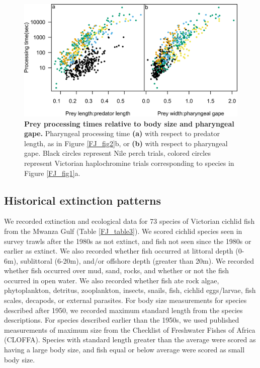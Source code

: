 \begin{figure}
    \centering
    \includegraphics[width=\textwidth]{FishJaws/figures/fig5}
    \caption{\textbf{Prey processing times relative to body size and pharyngeal gape.} Pharyngeal processing time \textbf{(a)} with respect to predator length, as in Figure \ref{FJ_fig2}b, or \textbf{(b)} with respect to pharyngeal gape. Black circles represent Nile perch trials, colored circles represent Victorian haplochromine trials corresponding to species in Figure \ref{FJ_fig1}a.}
    \label{FJ_fig5}
\end{figure}

\subsection{Historical extinction patterns}

We recorded extinction and ecological data \cite{redlist} for 73 species of Victorian cichlid fish from the Mwanza Gulf (Table \ref{FJ_table3}). We scored cichlid species seen in survey trawls after the 1980s as not extinct, and fish not seen since the 1980s or earlier as extinct. We also recorded whether fish occurred at littoral depth (0-6m), sublittoral (6-20m), and/or offshore depth (greater than 20m). We recorded whether fish occurred over mud, sand, rocks, and whether or not the fish occurred in open water. We also recorded whether fish ate rock algae, phytoplankton, detritus, zooplankton, insects, snails, fish, cichlid eggs/larvae, fish scales, decapods, or external parasites. For body size measurements for species described after 1950, we recorded maximum standard length from the species descriptions. \cite{greenwood1981haplochromine, witte1980haplochromine, hoogerhoud1982ecological, van1991systematic, van1992haplochromis, van1996taxonomical, seehausen1996lake, seehausen1998mbipi, van2004haplochromis, seegers2008fishes, van2008haplochromis, de2010seven, de2013two} For species described earlier than the 1950s, we used published measurements of maximum size from the Checklist of Freshwater Fishes of Africa (CLOFFA). \cite[p. 100-184]{daget1991check} Species with standard length greater than the average were scored as having a large body size, and fish equal or below average were scored as small body size.
	
